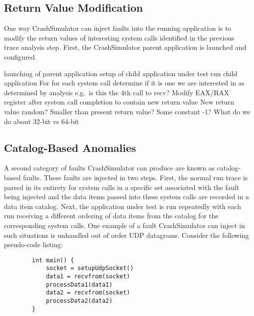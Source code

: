    \subsection{Return Value Modification}

     One way CrashSimulator can inject faults into the running application is to
    modify the return values of interesting system calls identified in the previous trace analysis step. First, the
    CrashSimulator parent application is launched and configured.

        launching of parent application
        setup of child application under test
        run child application
        For for each system call determine if it is one we are interested in as determined by analysis
            e.g.\ is this the 4th call to recv?
        Modify EAX/RAX register after system call completion to contain new return value
            New return value random? Smaller than present return value? Some constant -1?
            What do we do about 32-bit vs 64-bit

    \subsection{Catalog-Based Anomalies}

    A second category of faults CrashSimulator can produce are known as catalog-based
    faults. These faults are injected in two steps. First, the normal run trace is parsed in its entirety for system
    calls in a specific set associated with the fault being injected and the data items passed into these system calls
    are recorded in a data item catalog. Next, the application under test is run repeatedly with each run receiving a
    different ordering of data items from the catalog for the corresponding system calls. One example of a fault
    CrashSimulator can inject in such situations is unhandled out of order UDP datagrams. Consider the following
    pseudo-code listing:

    \begin{verbatim}
        int main() {
            socket = setupUdpSocket()
            data1 = recvfrom(socket)
            processData1(data1)
            data2 = recvfrom(socket)
            processData2(data2)
        }
    \end{verbatim}

